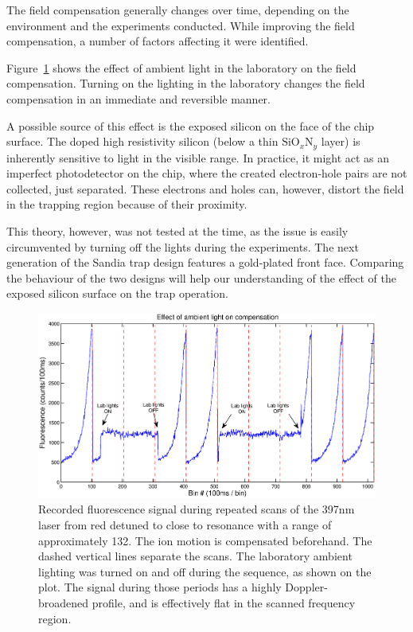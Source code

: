 The field compensation generally changes over time, depending on the environment and the experiments conducted. While improving the field compensation, a number of factors affecting it were identified. 

Figure~\ref{fig:lablightingcompensate} shows the effect of ambient light in the laboratory on the field compensation. Turning on the lighting in the laboratory changes the field compensation in an immediate and reversible manner. 

A possible source of this effect is the exposed silicon on the face of the chip surface. The doped high resistivity silicon (below a thin $\mbox{SiO}_x\mbox{N}_y$ layer) is inherently sensitive to light in the visible range. In practice, it might act as an imperfect photodetector on the chip, where the created electron-hole pairs are not collected, just separated. These electrons and holes can, however, distort the field in the trapping region because of their proximity. 

This theory, however, was not tested at the time, as the issue is easily circumvented by turning off the lights during the experiments. The next generation of the Sandia trap design features a gold-plated front face. Comparing the behaviour of the two designs will help our understanding of the effect of the exposed silicon surface on the trap operation.


\begin{figure}[h!t]
\centering
\includegraphics[width=14.5cm]{chapter6/lablights/lablights3}
\caption[Effect of ambient light on ion compensation]{Recorded fluorescence signal during repeated scans of the 397nm laser from red detuned to close to resonance with a range of approximately 132\MHz. The ion motion is compensated beforehand. The dashed vertical lines separate the scans. The laboratory ambient lighting was turned on and off during the sequence, as shown on the plot. The signal during those periods has a highly Doppler-broadened profile, and is effectively flat in the scanned frequency region. }
\label{fig:lablightingcompensate}
\end{figure} 


